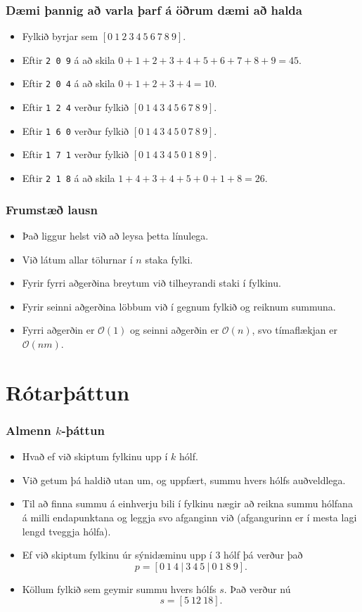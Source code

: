 \documentclass{beamer}
\renewcommand\O{\mathcal{O}}
\begin{document}
\begin{frame}
	\frametitle{Dæmi þannig að varla þarf á öðrum dæmi að halda}
\begin{itemize}
	\item<1-> Fylkið byrjar sem $[0\ 1\ 2\ 3\ 4\ 5\ 6\ 7\ 8\ 9]$.
	\item<2-> Eftir \texttt{2 0 9} á að skila $0 + 1 + 2 + 3 + 4 + 5 + 6 + 7 + 8 + 9 = 45$.
	\item<3-> Eftir \texttt{2 0 4} á að skila $0 + 1 + 2 + 3 + 4 = 10$.
	\item<4-> Eftir \texttt{1 2 4} verður fylkið $[0\ 1\ 4\ 3\ 4\ 5\ 6\ 7\ 8\ 9]$.
	\item<5-> Eftir \texttt{1 6 0} verður fylkið $[0\ 1\ 4\ 3\ 4\ 5\ 0\ 7\ 8\ 9]$.
	\item<6-> Eftir \texttt{1 7 1} verður fylkið $[0\ 1\ 4\ 3\ 4\ 5\ 0\ 1\ 8\ 9]$.
	\item<7-> Eftir \texttt{2 1 8} á að skila $1 + 4 + 3 + 4 + 5 + 0 + 1 + 8 = 26$.
\end{itemize}
\end{frame}

\begin{frame}
	\frametitle{Frumstæð lausn}
\begin{itemize}
	\item<1-> Það liggur helst við að leysa þetta línulega.
	\item<2-> Við látum allar tölurnar í $n$ staka fylki.
	\item<3-> Fyrir fyrri aðgerðina breytum við tilheyrandi staki í fylkinu.
	\item<4-> Fyrir seinni aðgerðina löbbum við í gegnum fylkið og reiknum summuna.
	\item<5-> Fyrri aðgerðin er $\O(1)$ og seinni aðgerðin er $\O(n)$,
		svo tímaflækjan er $\O(nm)$.
\end{itemize}
\end{frame}

\section[Rótarþáttun]{Rótarþáttun}

\begin{frame}
	\frametitle{Almenn $k$-þáttun}
\begin{itemize}
	\item<1-> Hvað ef við skiptum fylkinu upp í $k$ hólf.
	\item<2-> Við getum þá haldið utan um, og uppfært, summu hvers hólfs auðveldlega.
	\item<3-> Til að finna summu á einhverju bili í fylkinu nægir að reikna summu hólfana á milli
		endapunktana og leggja svo afganginn við (afgangurinn er í mesta lagi lengd tveggja hólfa).
	\item<4-> Ef við skiptum fylkinu úr sýnidæminu upp í $3$ hólf þá verður það
		\[
			p = [0\ 1\ 4\ |\ 3\ 4\ 5\ |\ 0\ 1\ 8\ 9].
		\]
	\item<5-> Köllum fylkið sem geymir summu hvers hólfs $s$. Það verður nú
		\[
			s = [5\ 12\ 18].
		\]
\end{itemize}
\end{frame}
\end{document}

